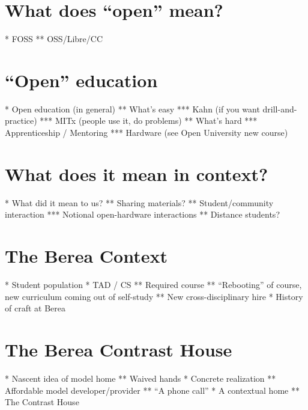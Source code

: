 
\begin{comment} %
* distributed / open source design is hard
* what does it mean for the course to be open?

* asked what would it mean for a course to be open; decided that we'd be designing for everyone and chose to focus on particular context
* developed personas & worked on understanding values in the context
* realized that distributed & open (course) design is incredibly hard
\end{comment}

\section{What does ``open'' mean?}

* FOSS
** OSS/Libre/CC

\section{``Open'' education}

* Open education (in general)
** What's easy
*** Kahn (if you want drill-and-practice)
*** MITx (people use it, do problems)
** What's hard
*** Apprenticeship / Mentoring
*** Hardware (see Open University new course)

\section{What does it mean in context?}

* What did it mean to us?
** Sharing materials?
** Student/community interaction
*** Notional open-hardware interactions
** Distance students?

\section{The Berea Context}

* Student population
* TAD / CS
** Required course
** ``Rebooting'' of course, new curriculum coming out of self-study
** New cross-disciplinary hire
* History of craft at Berea

\section{The Berea Contrast House}

* Nascent idea of model home
** Waived hands
* Concrete realization
** Affordable model developer/provider
** ``A phone call''
* A contextual home
** The Contrast House

